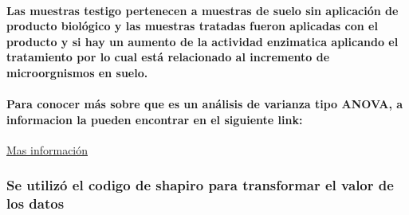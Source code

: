 \documentclass[
]{article}
\newenvironment{Shaded}{\begin{snugshade}}{\end{snugshade}}
\newcommand{\CommentTok}[1]{\textcolor[rgb]{0.56,0.35,0.01}{\textit{#1}}}
\newcommand{\ControlFlowTok}[1]{\textcolor[rgb]{0.13,0.29,0.53}{\textbf{#1}}}
\newcommand{\DecValTok}[1]{\textcolor[rgb]{0.00,0.00,0.81}{#1}}
\newcommand{\FunctionTok}[1]{\textcolor[rgb]{0.13,0.29,0.53}{\textbf{#1}}}
\newcommand{\NormalTok}[1]{#1}
\newcommand{\OtherTok}[1]{\textcolor[rgb]{0.56,0.35,0.01}{#1}}
\newcommand{\SpecialCharTok}[1]{\textcolor[rgb]{0.81,0.36,0.00}{\textbf{#1}}}
\begin{document}
\hypertarget{las-muestras-testigo-pertenecen-a-muestras-de-suelo-sin-aplicaciuxf3n-de-producto-bioluxf3gico-y-las-muestras-tratadas-fueron-aplicadas-con-el-producto-y-si-hay-un-aumento-de-la-actividad-enzimatica-aplicando-el-tratamiento-por-lo-cual-estuxe1-relacionado-al-incremento-de-microorgnismos-en-suelo.}{%
\paragraph{Las muestras testigo pertenecen a muestras de suelo sin
aplicación de producto biológico y las muestras tratadas fueron
aplicadas con el producto y si hay un aumento de la actividad enzimatica
aplicando el tratamiento por lo cual está relacionado al incremento de
microorgnismos en
suelo.}\label{las-muestras-testigo-pertenecen-a-muestras-de-suelo-sin-aplicaciuxf3n-de-producto-bioluxf3gico-y-las-muestras-tratadas-fueron-aplicadas-con-el-producto-y-si-hay-un-aumento-de-la-actividad-enzimatica-aplicando-el-tratamiento-por-lo-cual-estuxe1-relacionado-al-incremento-de-microorgnismos-en-suelo.}}

\hypertarget{para-conocer-muxe1s-sobre-que-es-un-anuxe1lisis-de-varianza-tipo-anova-a-informacion-la-pueden-encontrar-en-el-siguiente-link}{%
\paragraph{Para conocer más sobre que es un análisis de varianza tipo
ANOVA, a informacion la pueden encontrar en el siguiente
link:}\label{para-conocer-muxe1s-sobre-que-es-un-anuxe1lisis-de-varianza-tipo-anova-a-informacion-la-pueden-encontrar-en-el-siguiente-link}}

\href{https://rpubs.com/Joaquin_AR/219148}{Mas información}

\hypertarget{se-utilizuxf3-el-codigo-de-shapiro-para-transformar-el-valor-de-los-datos}{%
\subsubsection{Se utilizó el codigo de shapiro para transformar el valor
de los
datos}\label{se-utilizuxf3-el-codigo-de-shapiro-para-transformar-el-valor-de-los-datos}}

\begin{Shaded}
\end{Shaded}
\end{document}
